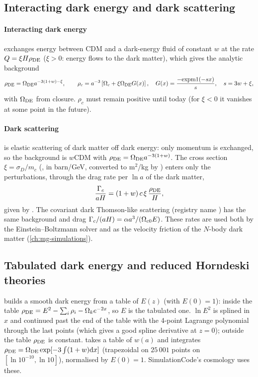 \subsection{Interacting dark energy and dark scattering}

\paragraph*{Interacting dark energy} \cite{Valiviita2008,Gavela2009} exchanges energy between CDM and a dark-energy
fluid of constant $w$ at the rate $Q=\xi H\rho_{\rm DE}$ ($\xi>0$: energy flows to the dark matter), which gives the
analytic background
\begin{equation}
\rho_{\rm DE}=\Omega_{\rm DE}a^{-3(1+w)-\xi},\qquad
\rho_c=a^{-3}\left[\Omega_c+\xi\Omega_{\rm DE}G(x)\right],\quad G(x)=\frac{-\mathrm{expm1}(-sx)}{s},\quad s=3w+\xi,
\end{equation}
with $\Omega_{\rm DE}$ from closure. $\rho_c$ must remain positive until today (for $\xi<0$ it vanishes at some point in
the future).

\paragraph*{Dark scattering} \cite{Simpson2010,BaldiSimpson2015} is elastic scattering of dark matter off dark
energy: only momentum is exchanged, so the background is $w$CDM with $\rho_{\rm DE}=\Omega_{\rm DE}a^{-3(1+w)}$. The
cross section $\xi=\sigma_D/m_c$ (, in barn/GeV, converted to m$^2$/kg by
) enters only the perturbations, through the drag rate per $\ln a$ of the dark matter,
\begin{equation}
\frac{\Gamma_c}{aH}=(1+w)\,c\,\xi\,\frac{\rho_{\rm DE}}{H},
\end{equation}
given by . The covariant dark Thomson-like scattering (registry name
) has the same background and drag $\Gamma_c/(aH)=\alpha a^3/(\Omega_{c0}E)$. These rates
are used both by the Einstein--Boltzmann solver and as the velocity friction of the $N$-body dark matter
(\cref{ch:mg-simulations}).

\subsection{Tabulated dark energy and reduced Horndeski theories}

 builds a smooth dark energy from a table of $E(z)$ (with $E(0)=1$): inside the table
$\rho_{\rm DE}=E^2-\sum_i\rho_i-\Omega_ke^{-2x}$, so $E$ is the tabulated one. $\ln E^2$ is splined in $x$ and continued
past the end of the table with the 4-point Lagrange polynomial through the last points (which gives a good spline
derivative at $z=0$); outside the table $\rho_{\rm DE}$ is constant.  takes a table of $w(a)$
and integrates $\rho_{\rm DE}=\Omega_{\rm DE}\exp[-3\int(1+w)\mathrm{d} x]$ (trapezoidal on $25\,001$ points on
$[\ln10^{-10},\ln10]$), normalised by $E(0)=1$. SimulationCode's  cosmology uses these.

